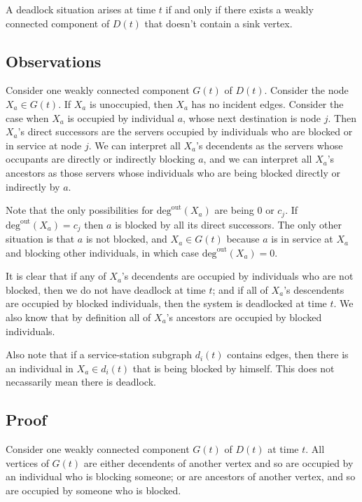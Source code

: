 \documentclass{article}
\begin{document}
A deadlock situation arises at time $t$ if and only if there exists a weakly connected component of $D(t)$ that doesn't contain a sink vertex.\newline

\subsection*{Observations}

Consider one weakly connected component $G(t)$ of $D(t)$.
Consider the node $X_a \in G(t)$. If $X_a$ is unoccupied, then $X_a$ has no incident edges.
Consider the case when $X_a$ is occupied by individual $a$, whose next destination is node $j$.
Then $X_a$'s direct successors are the servers occupied by individuals who are blocked or in service at node $j$.
We can interpret all $X_a$'s decendents as the servers whose occupants are directly or indirectly blocking $a$, and we can interpret all $X_a$'s ancestors as those servers whose individuals who are being blocked directly or indirectly by $a$.\newline

Note that the only possibilities for $\text{deg}^{\text{out}}(X_a)$ are being 0 or $c_j$.
If $\text{deg}^{\text{out}}(X_a) = c_j$ then $a$ is blocked by all its direct successors.
The only other situation is that $a$ is not blocked, and $X_a \in G(t)$ because $a$ is in service at $X_a$ and blocking other individuals, in which case $\text{deg}^{\text{out}}(X_a) = 0$.\newline

It is clear that if any of $X_a$'s decendents are occupied by individuals who are not blocked, then we do not have deadlock at time $t$; and if all of $X_a$'s descendents are occupied by blocked individuals, then the system is deadlocked at time $t$.
We also know that by definition all of $X_a$'s ancestors are occupied by blocked individuals.\newline

Also note that if a service-station subgraph $d_i(t)$ contains edges, then there is an individual in $X_a \in d_i(t)$ that is being blocked by himself.
This does not necassarily mean there is deadlock.\newline

\subsection*{Proof}

Consider one weakly connected component $G(t)$ of $D(t)$ at time $t$.
All vertices of $G(t)$ are either decendents of another vertex and so are occupied by an individual who is blocking someone; or are ancestors of another vertex, and so are occupied by someone who is blocked.\newline
\end{document}
